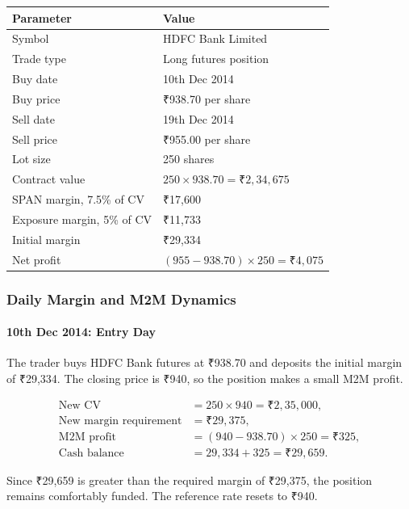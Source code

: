 \documentclass[12pt,openany]{book}
\begin{document}
\begin{center}
\small
\begin{tabular}{|L{0.38\textwidth}|L{0.42\textwidth}|}
\hline
\textbf{Parameter} & \textbf{Value} \\ \hline
Symbol & HDFC Bank Limited \\ \hline
Trade type & Long futures position \\ \hline
Buy date & 10th Dec 2014 \\ \hline
Buy price & ₹938.70 per share \\ \hline
Sell date & 19th Dec 2014 \\ \hline
Sell price & ₹955.00 per share \\ \hline
Lot size & 250 shares \\ \hline
Contract value & \(250 \times 938.70 = \text{₹}2{,}34{,}675\) \\ \hline
SPAN margin, 7.5\% of CV & ₹17,600 \\ \hline
Exposure margin, 5\% of CV & ₹11,733 \\ \hline
Initial margin & ₹29,334 \\ \hline
Net profit & \((955 - 938.70) \times 250 = \text{₹}4{,}075\) \\ \hline
\end{tabular}
\end{center}

\subsubsection{Daily Margin and M2M Dynamics}

\paragraph{10th Dec 2014: Entry Day}
The trader buys HDFC Bank futures at ₹938.70 and deposits the initial margin of ₹29,334. The closing price is ₹940, so the position makes a small M2M profit.

\begin{align*}
\text{New CV} &= 250 \times 940 = \text{₹}2{,}35{,}000, \\
\text{New margin requirement} &= \text{₹}29{,}375, \\
\text{M2M profit} &= (940 - 938.70) \times 250 = \text{₹}325, \\
\text{Cash balance} &= 29{,}334 + 325 = \text{₹}29{,}659.
\end{align*}

Since ₹29,659 is greater than the required margin of ₹29,375, the position remains comfortably funded. The reference rate resets to ₹940.
\end{document}
